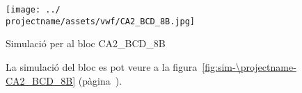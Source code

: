 \begin{contendfig}
  \begin{center}
    \texttt{[image: ../\\projectname/assets/vwf/CA2\_BCD\_8B.jpg]}
  \end{center}
  \caption{\label{fig:sim-\projectname-CA2_BCD_8B} Simulació per al bloc \textsf{CA2\_BCD\_8B}}
\end{contendfig}

La simulació del bloc es pot veure a la figura~\ref{fig:sim-\projectname-CA2_BCD_8B} (pàgina~\pageref{fig:sim-\projectname-CA2_BCD_8B}).


\vspace{1cm}
